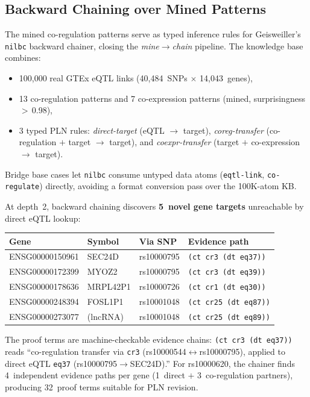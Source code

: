 \documentclass[11pt]{article}
\newcommand{\code}[1]{\texttt{#1}}
\begin{document}
\subsection{Backward Chaining over Mined Patterns}

The mined co-regulation patterns serve as typed inference rules for
Geisweiller's \code{nilbc} backward chainer, closing the
\emph{mine$\to$chain} pipeline.  The knowledge base combines:
\begin{itemize}
\item 100{,}000 real GTEx eQTL links (40{,}484~SNPs $\times$ 14{,}043~genes),
\item 13 co-regulation patterns and 7 co-expression patterns (mined,
  surprisingness $>$\,0.98),
\item 3 typed PLN rules: \emph{direct-target} (eQTL $\to$ target),
  \emph{coreg-transfer} (co-regulation $+$ target $\to$ target), and
  \emph{coexpr-transfer} (target $+$ co-expression $\to$ target).
\end{itemize}
Bridge base cases let \code{nilbc} consume untyped data atoms
(\code{eqtl-link}, \code{co-regulate}) directly, avoiding a format
conversion pass over the 100K-atom KB\@.

At depth~2, backward chaining discovers \textbf{5~novel gene targets}
unreachable by direct eQTL lookup:

\begin{center}
\begin{tabular}{llll}
\toprule
Gene & Symbol & Via SNP & Evidence path \\
\midrule
ENSG00000150961 & SEC24D  & rs10000795 & \code{(ct cr3 (dt eq37))} \\
ENSG00000172399 & MYOZ2   & rs10000795 & \code{(ct cr3 (dt eq39))} \\
ENSG00000178636 & MRPL42P1 & rs10000726 & \code{(ct cr1 (dt eq30))} \\
ENSG00000248394 & FOSL1P1  & rs10001048 & \code{(ct cr25 (dt eq87))} \\
ENSG00000273077 & (lncRNA)  & rs10001048 & \code{(ct cr25 (dt eq89))} \\
\bottomrule
\end{tabular}
\end{center}

The proof terms are machine-checkable evidence chains: \code{(ct cr3
(dt eq37))} reads ``co-regulation transfer via \code{cr3}
(rs10000544$\leftrightarrow$rs10000795), applied to direct eQTL
\code{eq37} (rs10000795$\to$SEC24D).''  For rs10000620, the chainer
finds 4~independent evidence paths per gene (1~direct $+$
3~co-regulation partners), producing 32~proof terms suitable for PLN
revision.
\end{document}
